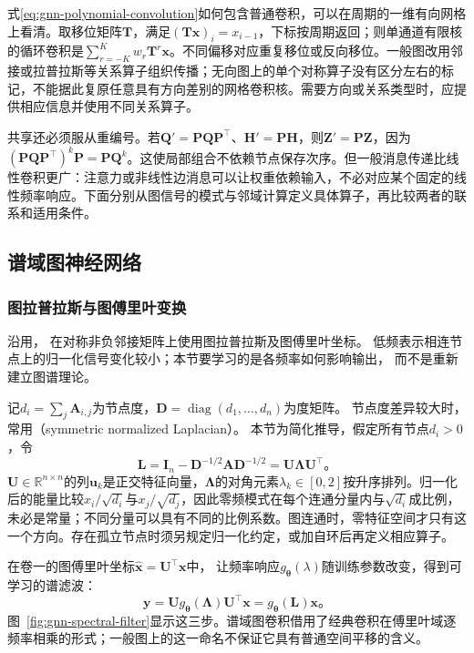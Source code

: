 式\eqref{eq:gnn-polynomial-convolution}如何包含普通卷积，可以在周期的一维有向网格上看清。取移位矩阵$\bm{T}$，满足$(\bm{T}\bm{x})_i=x_{i-1}$，下标按周期返回；则单通道有限核的循环卷积是$\sum_{r=-K}^{K}w_r\bm{T}^{r}\bm{x}$。不同偏移对应重复移位或反向移位。一般图改用邻接或拉普拉斯等关系算子组织传播；无向图上的单个对称算子没有区分左右的标记，不能据此复原任意具有方向差别的网格卷积核。需要方向或关系类型时，应提供相应信息并使用不同关系算子。

共享还必须服从重编号。若$\bm{Q}'=\bm{P}\bm{Q}\bm{P}^{\top}$、$\bm{H}'=\bm{P}\bm{H}$，则$\bm{Z}'=\bm{P}\bm{Z}$，因为$(\bm{P}\bm{Q}\bm{P}^{\top})^k\bm{P}=\bm{P}\bm{Q}^k$。这使局部组合不依赖节点保存次序。但一般消息传递比线性卷积更广：注意力或非线性边消息可以让权重依赖输入，不必对应某个固定的线性频率响应。下面分别从图信号的模式与邻域计算定义具体算子，再比较两者的联系和适用条件。

\subsection{谱域图神经网络}
\label{sec:gnn-spectral}

\subsubsection{图拉普拉斯与图傅里叶变换}
\label{sec:gnn-graph-fourier}

沿用，
在对称非负邻接矩阵上使用图拉普拉斯及图傅里叶坐标。
低频表示相连节点上的归一化信号变化较小；本节要学习的是各频率如何影响输出，
而不是重新建立图谱理论。

记$d_i=\sum_j\bm A_{i,j}$为节点度，$\bm D=\operatorname{diag}(d_1,\ldots,d_n)$为度矩阵。
节点度差异较大时，常用（symmetric normalized Laplacian）。
本节为简化推导，假定所有节点$d_i>0$，令
\begin{equation}
  \bm{L}=\bm{I}_n-\bm{D}^{-1/2}\bm{A}\bm{D}^{-1/2}
    =\bm{U}\bm{\Lambda}\bm{U}^{\top}\text{。}
  \label{eq:gnn-laplacian-spectrum}
\end{equation}
$\bm{U}\in\mathbb{R}^{n\times n}$的列$\bm{u}_k$是正交特征向量，$\bm{\Lambda}$的对角元素$\lambda_k\in[0,2]$按升序排列。归一化后的能量比较$x_i/\sqrt{d_i}$与$x_j/\sqrt{d_j}$，因此零频模式在每个连通分量内与$\sqrt{d_i}$成比例，未必是常量；不同分量可以具有不同的比例系数。图连通时，零特征空间才只有这一个方向。存在孤立节点时须另规定归一化约定，或加自环后再定义相应算子。

在卷一的图傅里叶坐标$\widehat{\bm x}=\bm U^\top\bm x$中，
让频率响应$g_{\bm\theta}(\lambda)$随训练参数改变，得到可学习的谱滤波：
\begin{equation}
  \bm{y}=\bm{U}g_{\bm{\theta}}(\bm{\Lambda})\bm{U}^{\top}\bm{x}
    =g_{\bm{\theta}}(\bm{L})\bm{x}\text{。}
  \label{eq:gnn-spectral-filter}
\end{equation}
图~\ref{fig:gnn-spectral-filter}显示这三步。谱域图卷积借用了经典卷积在傅里叶域逐频率相乘的形式；一般图上的这一命名不保证它具有普通空间平移的含义。

